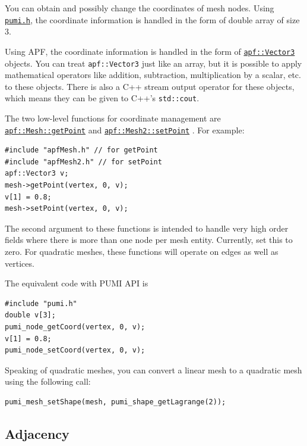 \documentclass{article}
\begin{document}
{You can obtain and possibly change the coordinates of mesh nodes.
Using \href{https://github.com/SCOREC/core/blob/master/pumi/pumi.h}{\texttt{pumi.h}}, the coordinate information is handled in the form of double array of size 3.

Using APF, the coordinate information is handled in the form of
\href{http://scorec.rpi.edu/~dibanez/core/classapf_1_1Vector3.html#_details}{\texttt{apf::Vector3}}
objects.
You can treat \texttt{apf::Vector3} just like an array, but it is
possible to apply mathematical operators like addition, subtraction,
multiplication by a scalar, etc. to these objects.
There is also a C++ stream output operator for these objects, which
means they can be given to C++'s \texttt{std::cout}.

The two low-level functions for coordinate management are
\href{http://scorec.rpi.edu/~dibanez/core/classapf_1_1Mesh.html#a27c491ae08a8248e292179dbd7dacb39}{\texttt{apf::Mesh::getPoint}}
and
\href{http://scorec.rpi.edu/~dibanez/core/classapf_1_1Mesh2.html#a39ad215b2b6d6b75d55819fbbc138f57}{\texttt{apf::Mesh2::setPoint}}
.
For example:

\begin{lstlisting}
#include "apfMesh.h" // for getPoint
#include "apfMesh2.h" // for setPoint
apf::Vector3 v;
mesh->getPoint(vertex, 0, v);
v[1] = 0.8;
mesh->setPoint(vertex, 0, v);
\end{lstlisting}

The second argument to these functions is intended to handle
very high order fields where there is more than one node
per mesh entity.
Currently, set this to zero.
For quadratic meshes, these functions will operate on edges as well as vertices.

The equivalent code with PUMI API is

\begin{lstlisting}
#include "pumi.h"
double v[3];
pumi_node_getCoord(vertex, 0, v);
v[1] = 0.8;
pumi_node_setCoord(vertex, 0, v);
\end{lstlisting}

Speaking of quadratic meshes, you can convert a linear mesh
to a quadratic mesh using the following call:

\begin{lstlisting}
pumi_mesh_setShape(mesh, pumi_shape_getLagrange(2));
\end{lstlisting}

\subsection{Adjacency}

}
\end{document}
